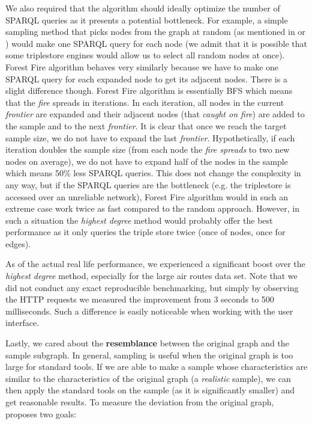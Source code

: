 We also required that the algorithm should ideally optimize the number of SPARQL queries as it presents a potential bottleneck. For example, a simple sampling method that picks nodes from the graph at random (as mentioned in \cite{rafiei2005effectively} or \cite{leskovec2006sampling}) would make one SPARQL query for each node (we admit that it is possible that some triplestore engines would allow us to select all random nodes at once). Forest Fire algorithm behaves very similarly because we have to make one SPARQL query for each expanded node to get its adjacent nodes. There is a slight difference though. Forest Fire algorithm is essentially BFS which means that the \emph{fire} spreads in iterations. In each iteration, all nodes in the current \emph{frontier} are expanded and their adjacent nodes (that \emph{caught on fire}) are added to the sample and to the next \emph{frontier}. It is clear that once we reach the target sample size, we do not have to expand the last \emph{frontier}. Hypothetically, if each iteration doubles the sample size (from each node the \emph{fire spreads} to two new nodes on average), we do not have to expand half of the nodes in the sample which means 50\% less SPARQL queries. This does not change the complexity in any way, but if the SPARQL queries are the bottleneck (e.g. the triplestore is accessed over an unreliable network), Forest Fire algorithm would  in such an extreme case work twice as fast compared to the random approach. However, in such a situation the \emph{highest degree} method would probably offer the best performance as it only queries the triple store twice (once of nodes, once for edges).

As of the actual real life performance, we experienced a significant boost over the \emph{highest degree} method, especially for the large air routes data set. Note that we did not conduct any exact reproducible benchmarking, but simply by observing the HTTP requests we measured the improvement from 3 seconds to 500 milliseconds. Such a difference is easily noticeable when working with the user interface.

Lastly, we cared about the \textbf{resemblance} between the original graph and the sample subgraph. In general, sampling is useful when the original graph is too large for standard tools. If we are able to make a sample whose characteristics are similar to the characteristics of the original graph (a \emph{realistic} sample), we can then apply the standard tools on the sample (as it is significantly smaller) and get reasonable results. To measure the deviation from the original graph, \cite{leskovec2006sampling} proposes two goals: 

